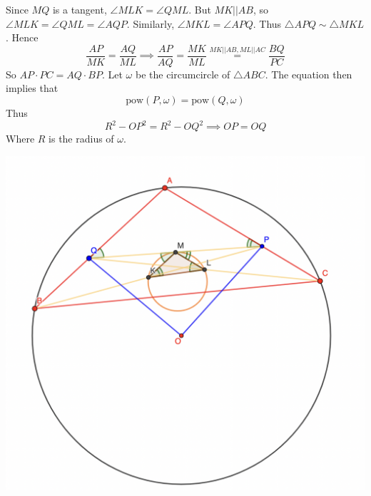 \documentclass[11pt]{scrartcl}
\begin{document}
\begin{soln}
  Since $MQ$ is a tangent, $\angle MLK=\angle QML$. But $MK||AB$, so $\angle MLK=\angle QML=\angle AQP$. Similarly, $\angle MKL=\angle APQ$.
  Thus $\triangle APQ\sim\triangle MKL$. Hence
  $$\frac{AP}{MK}=\frac{AQ}{ML}\implies \frac{AP}{AQ}=\frac{MK}{ML}\stackrel{MK||AB, ML||AC}{=}\frac{BQ}{PC}$$
  So $AP\cdot PC=AQ\cdot BP$. Let $\omega$ be the circumcircle of $\triangle ABC$. The equation then implies that
  $$\mathrm{pow}(P,\omega)=\mathrm{pow}(Q,\omega)$$
  Thus
  $$R^2-OP^2=R^2-OQ^2\implies OP=OQ$$
  Where $R$ is the radius of $\omega$.
  \begin{center}\includegraphics[scale=0.3]{IMO2009P2.png}\end{center}
\end{soln}
\end{document}
